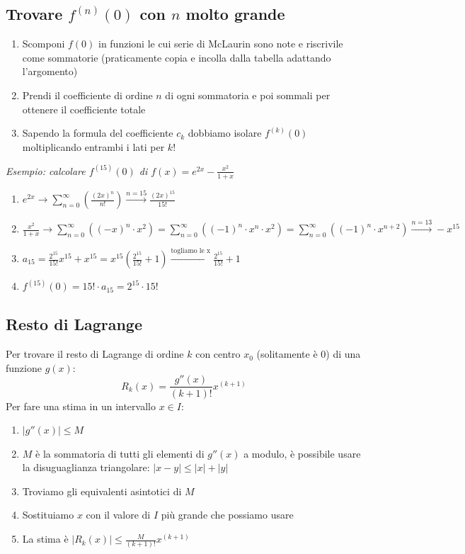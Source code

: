 \documentclass[10pt, a4paper]{article}
\begin{document}
    \subsection{Trovare $f^{(n)}(0)$ con $n$ molto grande}
        \begin{enumerate}
            \item Scomponi $f(0)$ in funzioni le cui serie di McLaurin sono note e riscrivile come sommatorie (praticamente copia e incolla dalla tabella adattando l'argomento)
            \item Prendi il coefficiente di ordine $n$ di ogni sommatoria e poi sommali per ottenere il coefficiente totale
            \item Sapendo la formula del coefficiente $c_k$ dobbiamo isolare $f^{(k)}(0)$ moltiplicando entrambi i lati per $k!$
        \end{enumerate}
        \textit{Esempio: calcolare $f^{(15)}(0)$ di $f(x)=e^{2x}-\frac{x^2}{1+x}$}
        \begin{enumerate}
            \item $e^{2x}\rightarrow\sum_{n=0}^{\infty}\left(\frac{(2x)^n}{n!}\right)\xrightarrow{n=15}\frac{(2x)^{15}}{15!}$
            \item $\frac{x^2}{1+x}\rightarrow\sum_{n=0}^{\infty}\left((-x)^n\cdot x^2\right)=\sum_{n=0}^{\infty}\left((-1)^n\cdot x^n\cdot x^2\right)=\sum_{n=0}^{\infty}\left((-1)^n\cdot x^{n+2}\right)\xrightarrow{n=13} -x^{15}$
            \item $a_{15}=\frac{2^{15}}{15!}x^{15}+x^{15}=x^{15}\left(\frac{2^{15}}{15!}+1\right)\xrightarrow{\text{togliamo le x}} \frac{2^{15}}{15!}+1$
            \item $f^{(15)}(0)=15!\cdot a_{15}=2^{15}\cdot 15!$
        \end{enumerate}
    \subsection{Resto di Lagrange}
        Per trovare il resto di Lagrange di ordine $k$ con centro $x_0$ (solitamente è 0) di una funzione $g(x)$:
        $$
            R_k(x) = \frac{g''(x)}{(k+1)!}x^{(k+1)}
        $$
        Per fare una stima in un intervallo $x\in I$:
        \begin{enumerate}
            \item $|g''(x)|\leq M$
            \item $M$ è la sommatoria di tutti gli elementi di $g''(x)$ a modulo, è possibile usare la disuguaglianza triangolare: $|x-y|\leq |x|+|y|$
            \item Troviamo gli equivalenti asintotici di $M$
            \item Sostituiamo $x$ con il valore di $I$ più grande che possiamo usare
            \item La stima è $\displaystyle |R_k(x)|\leq \frac{M}{(k+1)!}x^{(k+1)}$
        \end{enumerate}
\end{document}
